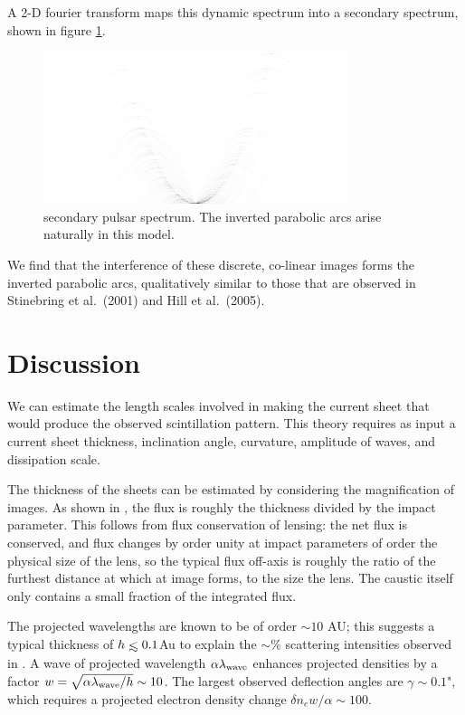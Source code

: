 \documentclass[useAMS,usenatbib]{mn2e}
\def\lesssim{\mathrel{\hbox{\rlap{\hbox{\lower4pt\hbox{$\sim$}}}\hbox{$<$}}}}
\begin{document}
A 2-D fourier transform maps this dynamic spectrum into a secondary
spectrum, shown in figure \ref{fig:ss}.

\begin{figure}
\centerline{\includegraphics[width=3.5in]{sspectr.jpg}}
\caption{secondary pulsar spectrum.  The inverted parabolic arcs arise
naturally in this model.}
\label{fig:ss}
\end{figure}

We find that the interference of these discrete, co-linear images
forms the inverted parabolic arcs, qualitatively similar to those that are observed in
Stinebring et al.~(2001) and Hill et al.~(2005).



\section{Discussion}

We can estimate the length scales involved in making the current sheet that
would produce the observed scintillation pattern.  This theory requires as
input a current sheet thickness, inclination angle, curvature,
amplitude of waves, and dissipation scale.

The thickness of the sheets can be estimated by considering the magnification of
images.  As shown in \cite{2012MNRAS.421L.132P}, the flux is roughly
the thickness divided by the impact parameter.  This follows from flux
conservation of lensing: the net flux is conserved, and flux changes
by order unity at impact parameters of order the physical size of the
lens, so the typical flux off-axis is roughly the ratio of the
furthest distance at which at image forms, to the size the lens.  The
caustic itself only contains a small fraction of the integrated flux.


The projected wavelengths
are known to be of order $\sim 10$ AU;
this suggests a typical thickness of $h\lesssim 0.1$Au to explain the
$\sim$\%  scattering intensities observed in \cite{2010ApJ...708..232B}.
A wave
of projected wavelength $\alpha \lambda_{\rm wave}$ enhances projected densities
by a factor $w=\sqrt{\alpha\lambda_{\rm wave}/h}\sim 10$.  The largest observed
deflection angles are $\gamma \sim 0.1$", which requires a
projected electron density change $\delta n_e w/\alpha \sim 100$.  
\end{document}
